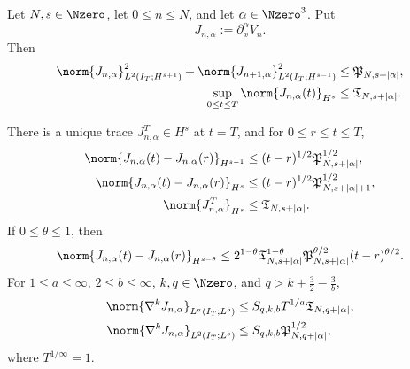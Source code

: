 \begin{theorem}
\label{thm:qc-mixed-jet}
\begin{samepage}
Let \(N,s\in\Nzero\), let \(0\le n\le N\), and let
\(\alpha\in\Nzero^3\).  Put
\[
 J_{n,\alpha}:=\partial_x^\alpha V_n.
\]
Then
\begin{align}
 \norm{J_{n,\alpha}}_{L^2(I_T;H^{s+1})}^2
 +\norm{J_{n+1,\alpha}}_{L^2(I_T;H^{s-1})}^2
 &\le \mathfrak P_{N,s+|\alpha|},
 \label{eq:qc-mixed-adjacent}\\
 \sup_{0\le t\le T}\norm{J_{n,\alpha}(t)}_{H^s}
 &\le \mathfrak T_{N,s+|\alpha|}.
 \label{eq:qc-mixed-trace}
\end{align}
\end{samepage}
There is a unique trace \(J_{n,\alpha}^T\in H^s\) at \(t=T\), and
for \(0\le r\le t\le T\),
\begin{align}
 \norm{J_{n,\alpha}(t)-J_{n,\alpha}(r)}_{H^{s-1}}
 &\le (t-r)^{1/2}\mathfrak P_{N,s+|\alpha|}^{1/2},
 \label{eq:qc-mixed-low-modulus}\\
 \norm{J_{n,\alpha}(t)-J_{n,\alpha}(r)}_{H^s}
 &\le (t-r)^{1/2}
        \mathfrak P_{N,s+|\alpha|+1}^{1/2},
 \label{eq:qc-mixed-strong-modulus}\\
 \norm{J_{n,\alpha}^T}_{H^s}
 &\le \mathfrak T_{N,s+|\alpha|}.
 \label{eq:qc-mixed-endpoint-size}
\end{align}
If \(0\le\theta\le1\), then
\begin{equation}
 \norm{J_{n,\alpha}(t)-J_{n,\alpha}(r)}_{H^{s-\theta}}
 \le
 2^{1-\theta}
 \mathfrak T_{N,s+|\alpha|}^{1-\theta}
 \mathfrak P_{N,s+|\alpha|}^{\theta/2}
 (t-r)^{\theta/2}.
 \label{eq:qc-mixed-interpolated-modulus}
\end{equation}
For \(1\le a\le\infty\), \(2\le b\le\infty\),
\(k,q\in\Nzero\), and
\(q>k+\frac32-\frac3b\),
\begin{align}
 \norm{\nabla^kJ_{n,\alpha}}_{L^a(I_T;L^b)}
 &\le S_{q,k,b}T^{1/a}\mathfrak T_{N,q+|\alpha|},
 \label{eq:qc-mixed-la-lb}\\
 \norm{\nabla^kJ_{n,\alpha}}_{L^2(I_T;L^b)}
 &\le S_{q,k,b}\mathfrak P_{N,q+|\alpha|}^{1/2},
 \label{eq:qc-mixed-l2-lb}
\end{align}
where \(T^{1/\infty}=1\).
\end{theorem}

